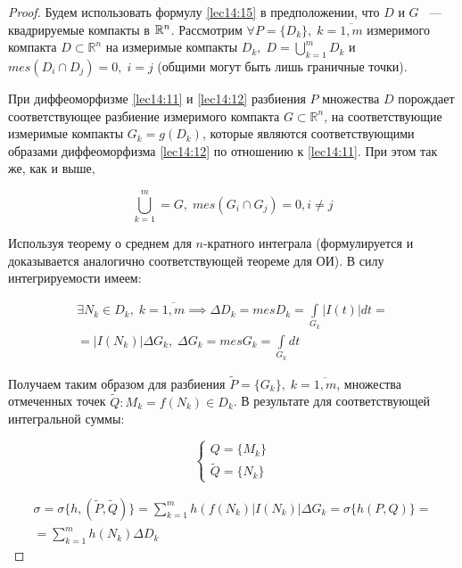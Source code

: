 \documentclass[../../main.tex]{subfiles}
\begin{document}
	
	\begin{proof}
		
	Будем использовать формулу \eqref{lec14:15} в предположении, что
	$D$ и $G$ ~--- квадрируемые компакты в $\mathbb{R}^n$. Рассмотрим $\forall P =
	\{ D_k \},\; k = \overline{1, m}$ измеримого компакта $D \subset 
	\mathbb{R}^n$ на измеримые компакты $D_k,\; D = \bigcup\limits_{k = 1}^{m} 
	D_k$ 
	и $mes\left(D_i \cap D_j\right) = 0,\; i = j$ (общими могут быть лишь
	граничные точки).
		   
	При диффеоморфизме \eqref{lec14:11} и \eqref{lec14:12} разбиения $P$ 
	множества $D$ порождает соответствующее разбиение измеримого компакта 
	$G \subset \mathbb{R}^n$, на соответствующие измеримые компакты
	$G_k = g(D_k)$, которые являются соответствующими образами диффеоморфизма 
	\eqref{lec14:12} по отношению к \eqref{lec14:11}. При этом так же, как и выше,
	
	\[
	\bigcup\limits_{k = 1}^{m} = G,\; mes\left(G_i \cap G_j\right) = 0, i \neq j
	\]
	
	Используя теорему о среднем для $n$-кратного интеграла (формулируется и 
	доказывается аналогично соответствующей теореме для ОИ). 
	В силу интегрируемости имеем:
	
	\[
	\begin{array}{c}
	\exists N_k \in D_k,\; k = \overline{1, m} \implies \Delta D_k = mes D_k 
	= \int\limits_{G_k} |I\left( t \right)| dt = \\ = |I \left( N_k \right) |
	 \Delta G_k,\; \Delta G_k = mes G_k = \int\limits_{G_k} dt
	\end{array}
	\]
	
		
	Получаем таким образом для разбиения $\widetilde{P} = \{ G_k  \},\; 
	k = \overline{1, m}$, множества отмеченных точек $\widetilde{Q} : M_k = 
	f(N_k) 
	\in D_k$. В результате для соответствующей интегральной суммы:
	
	\[
	\begin{cases}
	Q = \{ M_k \}\\
	\widetilde{Q} = \{ N_k \}
	\end{cases}
	\]
	
	\begin{equation}
	\label{lec15:40}
	\begin{gathered}
	\sigma = \sigma \{ h, (\widetilde{P}, \widetilde{Q}) \} = \sum_{k = 1}^{m} h 
	\left( f \left( N_k \right) \right|I\left( N_k \right)| \Delta G_k = 
	\sigma \{ h \left( P, Q \right) \} =\\= \sum_{k = 1}^{m} h 
	\left( N_k \right) \Delta D_k
	\end{gathered}
	\end{equation}
	

\end{proof}
\end{document}
